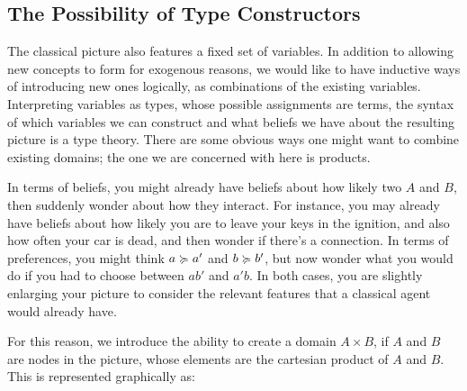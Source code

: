 \documentclass{article}
\begin{document}
	\subsection{The Possibility of Type Constructors}\label{sec:belief-typing}
	The classical picture also features a fixed set of variables. In addition to allowing new concepts to form for exogenous reasons, we would like to have inductive ways of introducing new ones logically, as combinations of the existing variables. Interpreting variables as types, whose possible assignments are terms, the syntax of which variables we can construct and what beliefs we have about the resulting picture is a type theory. There are some obvious ways one might want to combine existing domains; the one we are concerned with here is products.
	
	In terms of beliefs, you might already have beliefs about how likely two  $A$ and $B$, then suddenly wonder about how they interact. For instance, you may already have beliefs about how likely you are to leave your keys in the ignition, and also how often your car is dead, and then wonder if there's a connection. 
	In terms of preferences, you might think $a \succcurlyeq a'$ and $b \succcurlyeq b'$, but now wonder what you would do if you had to choose between $a b'$ and $a' b$. In both cases, you are slightly enlarging your picture to consider the relevant features that a classical agent would already have.
	
	For this reason, we introduce the ability to create a domain $A \times B$, if $A$ and $B$ are nodes in the picture, whose elements are the cartesian product of $A$ and $B$. %
	This is represented graphically as:
	\begin{center}
	\end{center}
	
	
\end{document}
